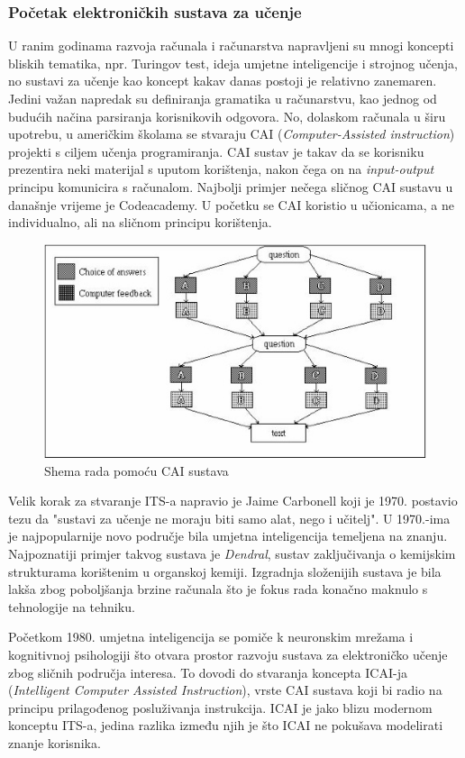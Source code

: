 \documentclass[times, utf8, zavrsni]{fer}
\begin{document}
\subsubsection{Početak elektroničkih sustava za učenje}
U ranim godinama razvoja računala i računarstva napravljeni su mnogi koncepti bliskih tematika, npr. Turingov test, ideja umjetne inteligencije i strojnog učenja, no sustavi za učenje kao koncept kakav danas postoji je relativno zanemaren. Jedini važan napredak su definiranja gramatika u računarstvu, kao jednog od budućih načina parsiranja korisnikovih odgovora. No, dolaskom računala u širu upotrebu, u američkim školama se stvaraju CAI (\textit{Computer-Assisted instruction}) projekti s ciljem učenja programiranja. CAI sustav je takav da se korisniku prezentira neki materijal s uputom korištenja, nakon čega on na \textit{input-output} principu komunicira s računalom. Najbolji primjer nečega sličnog CAI sustavu u današnje vrijeme je Codeacademy. U početku se CAI koristio u učionicama, a ne individualno, ali na sličnom principu korištenja.

\begin{figure}[htb]
	\centering
	\includegraphics[]{img/CAI_shema.jpg}
	\caption{Shema rada pomoću CAI sustava}
	\label{fig:cai}
\end{figure}

\par
Velik korak za stvaranje ITS-a napravio je Jaime Carbonell koji je 1970. postavio tezu da "sustavi za učenje ne moraju biti samo alat, nego i učitelj". U 1970.-ima je najpopularnije novo područje bila umjetna inteligencija temeljena na znanju. Najpoznatiji primjer takvog sustava je \textit{Dendral}, sustav zaključivanja o kemijskim strukturama korištenim u organskoj kemiji. Izgradnja složenijih sustava je bila lakša zbog poboljšanja brzine računala što je fokus rada konačno maknulo s tehnologije na tehniku. 
\par
Početkom 1980. umjetna inteligencija se pomiče k neuronskim mrežama i kognitivnoj psihologiji što otvara prostor razvoju sustava za elektroničko učenje zbog sličnih područja interesa. To dovodi do stvaranja koncepta ICAI-ja (\textit{Intelligent Computer Assisted Instruction}), vrste CAI sustava koji bi radio na principu prilagođenog posluživanja instrukcija. ICAI je jako blizu modernom konceptu ITS-a, jedina razlika između njih je što ICAI ne pokušava modelirati znanje korisnika.
\end{document}
